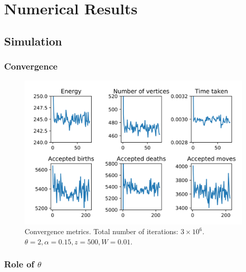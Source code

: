 \chapter{Numerical Results}\label{ch:numeric}


\section{Simulation}

\subsection{Convergence}


\begin{figure}
  \centering
    \includegraphics[width=1\textwidth]{../img/numeric/convergence.png}
  \caption{Convergence metrics. Total number of iterations: $3\times 10^6$. $\theta = 2, \alpha = 0.15, z = 500, W = 0.01$.}
\end{figure}




\subsection{Role of $\theta$}

